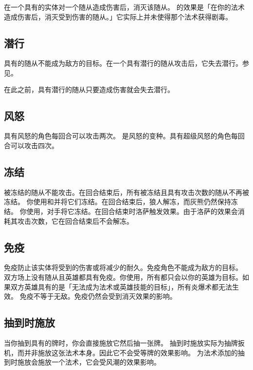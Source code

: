 在一个具有的实体对一个随从造成伤害后，消灭该随从。
\notice {}的效果是「在你的法术造成伤害后，消灭受到伤害的随从。」它实际上并未使得那个法术获得剧毒。

\subsection{潜行}
\label{stealth}

具有的随从不能成为敌方的目标。在一个具有潜行的随从攻击后，它失去潜行。参见。

 在此之前，具有潜行的随从只要造成伤害就会失去潜行。

\subsection{风怒}
\label{windfury}

具有风怒的角色每回合可以攻击两次。
\notice {}是风怒的变种。具有超级风怒的角色每回合可以攻击四次。

\subsection{冻结}
\label{freeze}

被冻结的随从不能攻击。在回合结束后，所有被冻结且具有攻击次数的随从不再被冻结。
\example 你使用和并将它们冻结。在回合结束后，狼人解冻，而灰熊仍然保持冻结。
\example 你使用，对手将它冻结。在回合结束时洛萨触发效果。由于洛萨的效果会消耗其攻击次数，它在回合结束后不会解冻。

\subsection{免疫}
\label{immune}

免疫防止该实体将受到的伤害或将减少的耐久。免疫角色不能成为敌方的目标。
\example 双方场上没有随从且英雄都具有免疫。你使用，所有都只会以你的英雄为目标。如果双方英雄具有的是「无法成为法术或英雄技能的目标」，所有炎爆术都无法生效。
\notice 免疫不等于无敌。免疫仍然会受到消灭效果的影响。

\subsection{抽到时施放}
\label{cast-when-drawn}

当你抽到具有的牌时，你会直接施放它然后抽一张牌。
\notice 抽到时施放实际为抽牌扳机，而并非施放这张法术本身。因此它不会受等牌的效果影响。
\exception {}为法术添加的抽到时施放会施放一个法术，它会受风潮的效果影响。


